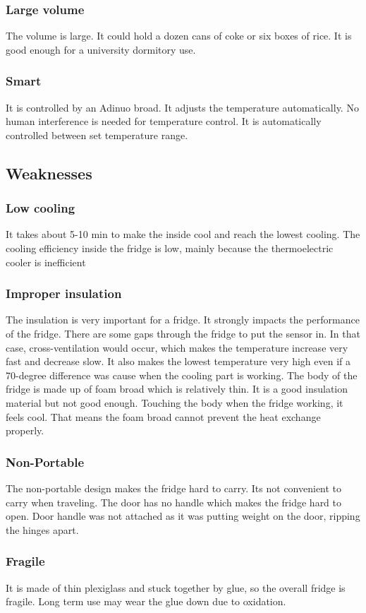 \documentclass[12pt,onecolumn]{article}
\begin{document}
\subsubsection{Large volume}
The volume is large. It could hold a dozen cans of coke or six boxes of rice. It is good enough for a university dormitory use.  
\subsubsection{Smart}
It is controlled by an Adinuo broad. It adjusts the temperature automatically. No human interference is needed for temperature control. It is automatically controlled between set temperature range. 
\subsection{Weaknesses}
\subsubsection{Low cooling}
It takes about 5-10 min to make the inside cool and reach the lowest cooling. The cooling efficiency inside the fridge is low, mainly because the thermoelectric cooler is inefficient 
\subsubsection{Improper insulation}
The insulation is very important for a fridge. It strongly impacts the performance of the fridge. There are some gaps through the fridge to put the sensor in. In that case, cross-ventilation would occur, which makes the temperature increase very fast and decrease slow. It also makes the lowest temperature very high even if a 70-degree difference was cause when the cooling part is working. The body of the fridge is made up of foam broad which is relatively thin. It is a good insulation material but not good enough. Touching the body when the fridge working, it feels cool. That means the foam broad cannot prevent the heat exchange properly.
\subsubsection{Non-Portable}
The non-portable design makes the fridge hard to carry. Its not convenient to carry when traveling. The door has no handle which makes the fridge hard to open. Door handle was not attached as it was putting weight on the door, ripping the hinges apart. 
\subsubsection{Fragile}
It is made of thin plexiglass and stuck together by glue, so the overall fridge is fragile. Long term use may wear the glue down due to oxidation. 
\end{document}
